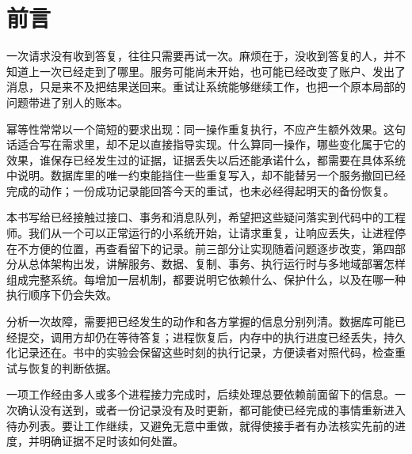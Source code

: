 \chapter*{前言}
\label{front:preface}
\begin{center}\end{center}

一次请求没有收到答复，往往只需要再试一次。麻烦在于，没收到答复的人，并不知道上一次已经走到了哪里。服务可能尚未开始，也可能已经改变了账户、发出了消息，只是来不及把结果送回来。重试让系统能够继续工作，也把一个原本局部的问题带进了别人的账本。

幂等性常常以一个简短的要求出现：同一操作重复执行，不应产生额外效果。这句话适合写在需求里，却不足以直接指导实现。什么算同一操作，哪些变化属于它的效果，谁保存已经发生过的证据，证据丢失以后还能承诺什么，都需要在具体系统中说明。数据库里的唯一约束能挡住一些重复写入，却不能替另一个服务撤回已经完成的动作；一份成功记录能回答今天的重试，也未必经得起明天的备份恢复。

本书写给已经接触过接口、事务和消息队列，希望把这些疑问落实到代码中的工程师。我们从一个可以正常运行的小系统开始，让请求重复，让响应丢失，让进程停在不方便的位置，再查看留下的记录。前三部分让实现随着问题逐步改变，第四部分从总体架构出发，讲解服务、数据、复制、事务、执行运行时与多地域部署怎样组成完整系统。每增加一层机制，都要说明它依赖什么、保护什么，以及在哪一种执行顺序下仍会失效。

分析一次故障，需要把已经发生的动作和各方掌握的信息分别列清。数据库可能已经提交，调用方却仍在等待答复；进程恢复后，内存中的执行进度已经丢失，持久化记录还在。书中的实验会保留这些时刻的执行记录，方便读者对照代码，检查重试与恢复的判断依据。

一项工作经由多人或多个进程接力完成时，后续处理总要依赖前面留下的信息。一次确认没有送到，或者一份记录没有及时更新，都可能使已经完成的事情重新进入待办列表。要让工作继续，又避免无意中重做，就得使接手者有办法核实先前的进度，并明确证据不足时该如何处置。

